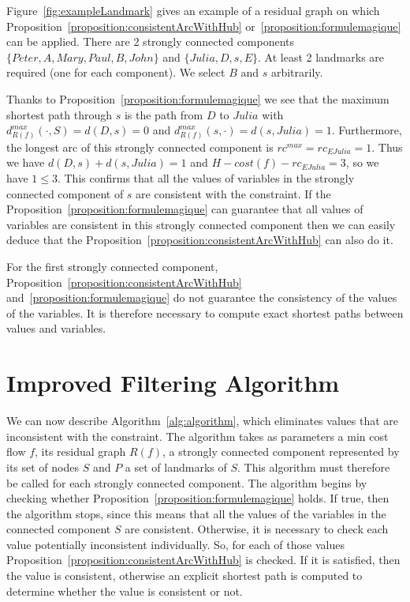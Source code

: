 Figure~\ref{fig:exampleLandmark} gives an example of a residual graph on which Proposition~\ref{proposition:consistentArcWithHub} or~\ref{proposition:formulemagique} can be applied. There are 2 strongly connected components $\{Peter, A, Mary, Paul, B, John\}$ and $\{Julia, D, s, E\}$. At least 2 landmarks are required (one for each component). We select $B$ and $s$ arbitrarily. 

Thanks to Proposition~\ref{proposition:formulemagique} we see that the maximum shortest path through $s$ is the path from $D$ to $Julia$ with $d^{max}_{R(f)}(\cdot, S)=d(D, s)=0$ and $d^{max}_{R(f)}(s, \cdot)=d(s, Julia)=1$. Furthermore, the longest arc of this strongly connected component is $rc^{max}=rc_{EJulia}=1$. Thus we have $d(D, s)+d(s, Julia)=1$ and $H-cost(f) - rc_{EJulia}=3$, so we have $1 \leq 3$. This confirms that all the values of variables in the strongly connected component of $s$ are consistent with the constraint.
If the Proposition~\ref{proposition:formulemagique} can guarantee that all values of variables are consistent in this strongly connected component then we can easily deduce that the Proposition~\ref{proposition:consistentArcWithHub} can also do it.

For the first strongly connected component, Proposition~\ref{proposition:consistentArcWithHub} and~\ref{proposition:formulemagique} do not guarantee the consistency 
of the values of the variables. It is therefore necessary to compute exact shortest paths between values and variables.

\section{Improved Filtering Algorithm}
\label{sec:ImprovedFilteringAlgorithm}
We can now describe Algorithm~\ref{alg:algorithm}, which eliminates values that are inconsistent with the constraint. The algorithm takes as parameters a min cost flow $f$, its residual graph $R(f)$, a strongly connected component represented by its set of nodes $S$ and $P$ a set of landmarks of $S$. This algorithm must therefore be called for each strongly connected component. The algorithm begins by checking whether Proposition~\ref{proposition:formulemagique} holds. If true, then the algorithm stops, since this means that all the values of the variables in the connected component $S$ are consistent.
Otherwise, it is necessary to check each value potentially inconsistent individually.
So, for each of those values Proposition~\ref{proposition:consistentArcWithHub} is checked. If it is satisfied, then the value is consistent, otherwise an explicit shortest path is computed to determine whether the value is consistent or not.

